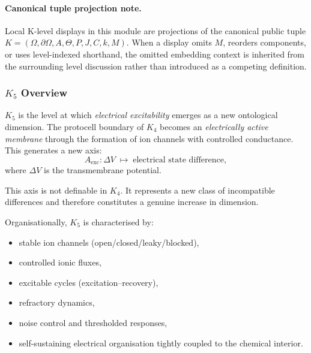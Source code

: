 



\paragraph{Canonical tuple projection note.}
Local K-level displays in this module are projections of the canonical public tuple \(K=(\Omega,\partial\Omega,A,\Theta,P,J,C,k,M)\). When a display omits \(M\), reorders components, or uses level-indexed shorthand, the omitted embedding context is inherited from the surrounding level discussion rather than introduced as a competing definition.

\subsubsection{\texorpdfstring{$K_5$}{K_5} Overview}
\label{sec:k5-overview}

$K_5$ is the level at which \emph{electrical excitability} emerges as a
new ontological dimension. The protocell boundary of $K_4$ becomes an
\emph{electrically active membrane} through the formation of ion channels
with controlled conductance. This generates a new axis:
\[
A_{\mathrm{exc}}: \Delta V \;\mapsto\; \text{electrical state difference},
\]
where $\Delta V$ is the transmembrane potential.

This axis is not definable in $K_4$. It represents a new class of
incompatible differences and therefore constitutes a genuine increase in
dimension.

Organisationally, $K_5$ is characterised by:
\begin{itemize}
    \item stable ion channels (open/closed/leaky/blocked),
    \item controlled ionic fluxes,
    \item excitable cycles (excitation–recovery),
    \item refractory dynamics,
    \item noise control and thresholded responses,
    \item self-sustaining electrical organisation tightly coupled to the
          chemical interior.
\end{itemize}


